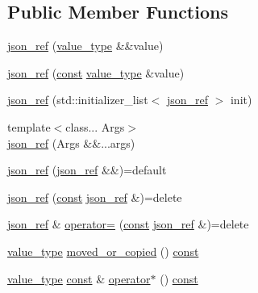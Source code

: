 \subsection*{Public Member Functions}
\begin{DoxyCompactItemize}
\item 
\hyperlink{classnlohmann_1_1detail_1_1json__ref_ae1adf5bcee8b6fa0c358710604fb1938}{json\+\_\+ref} (\hyperlink{classnlohmann_1_1detail_1_1json__ref_a78d76cf288141049568c0d670ed670ef}{value\+\_\+type} \&\&value)
\item 
\hyperlink{classnlohmann_1_1detail_1_1json__ref_a8c3eb3c6e952ed0cd7eece586ab4047c}{json\+\_\+ref} (\hyperlink{functions__c_8js_afacfd9c985d225bb07483b887a801b6f}{const} \hyperlink{classnlohmann_1_1detail_1_1json__ref_a78d76cf288141049568c0d670ed670ef}{value\+\_\+type} \&value)
\item 
\hyperlink{classnlohmann_1_1detail_1_1json__ref_adfba2db547283a7c6a5df9a32e72efc5}{json\+\_\+ref} (std\+::initializer\+\_\+list$<$ \hyperlink{classnlohmann_1_1detail_1_1json__ref}{json\+\_\+ref} $>$ init)
\item 
{\footnotesize template$<$class... Args$>$ }\\\hyperlink{classnlohmann_1_1detail_1_1json__ref_a84a813ad1c4b9524704b18684afd0708}{json\+\_\+ref} (Args \&\&...args)
\item 
\hyperlink{classnlohmann_1_1detail_1_1json__ref_a59221ddbd756ca24d289c787fab38dbc}{json\+\_\+ref} (\hyperlink{classnlohmann_1_1detail_1_1json__ref}{json\+\_\+ref} \&\&)=default
\item 
\hyperlink{classnlohmann_1_1detail_1_1json__ref_a4c68db46934e03588bbd73b00147c0dd}{json\+\_\+ref} (\hyperlink{functions__c_8js_afacfd9c985d225bb07483b887a801b6f}{const} \hyperlink{classnlohmann_1_1detail_1_1json__ref}{json\+\_\+ref} \&)=delete
\item 
\hyperlink{classnlohmann_1_1detail_1_1json__ref}{json\+\_\+ref} \& \hyperlink{classnlohmann_1_1detail_1_1json__ref_a98956ba676b1ae16b62346f9c4fb752e}{operator=} (\hyperlink{functions__c_8js_afacfd9c985d225bb07483b887a801b6f}{const} \hyperlink{classnlohmann_1_1detail_1_1json__ref}{json\+\_\+ref} \&)=delete
\item 
\hyperlink{classnlohmann_1_1detail_1_1json__ref_a78d76cf288141049568c0d670ed670ef}{value\+\_\+type} \hyperlink{classnlohmann_1_1detail_1_1json__ref_ab82818e9b8cc63cb76e61fe6b68959a5}{moved\+\_\+or\+\_\+copied} () \hyperlink{functions__c_8js_afacfd9c985d225bb07483b887a801b6f}{const} 
\item 
\hyperlink{classnlohmann_1_1detail_1_1json__ref_a78d76cf288141049568c0d670ed670ef}{value\+\_\+type} \hyperlink{functions__c_8js_afacfd9c985d225bb07483b887a801b6f}{const} \& \hyperlink{classnlohmann_1_1detail_1_1json__ref_adec75260903212a3bf1235fced3f2e51}{operator$\ast$} () \hyperlink{functions__c_8js_afacfd9c985d225bb07483b887a801b6f}{const} 

\end{DoxyCompactItemize}

